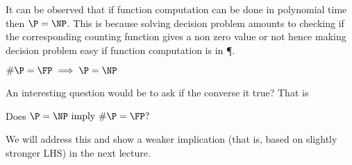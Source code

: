 \documentclass{report}
\begin{document}
\begin{figure}[htp!]
\centering
{}
\end{figure}

It can be observed that if function computation can be done in polynomial time
then $\P = \NP$. This is because solving decision problem amounts to checking
if the corresponding counting function gives a non zero value or not hence
making decision problem easy if function computation is in \P. 
\begin{lemma}
$\#\P = \FP \implies \P = \NP$
\end{lemma}

An interesting question would be to ask if the converse it true? That is 
\begin{center}
Does $\P = \NP \text{ imply }  \#\P = \FP ?$
\end{center}
We will address this and show a weaker implication (that is, based on slightly stronger LHS) in the next lecture.


\ifnum{}
\end{document}
